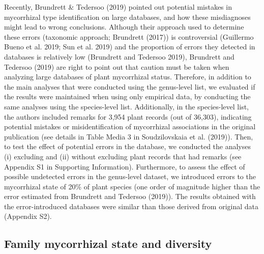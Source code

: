 \documentclass[
  12pt,
]{article}
\begin{document}
Recently, Brundrett \& Tedersoo (2019) pointed out potential mistakes in
mycorrhizal type identification on large databases, and how these
misdiagnoses might lead to wrong conclusions. Although their approach
used to determine these errors (taxonomic approach; Brundrett (2017)) is
controversial (Guillermo Bueno et al. 2019; Sun et al. 2019) and the
proportion of errors they detected in databases is relatively low
(Brundrett and Tedersoo 2019), Brundrett and Tedersoo (2019) are right
to point out that caution must be taken when analyzing large databases
of plant mycorrhizal status. Therefore, in addition to the main analyses
that were conducted using the genus-level list, we evaluated if the
results were maintained when using only empirical data, by conducting
the same analyses using the species-level list. Additionally, in the
species-level list, the authors included remarks for 3,954 plant records
(out of 36,303), indicating potential mistakes or misidentification of
mycorrhizal associations in the original publication (see details in
Table Media 3 in Soudzilovskaia et al. (2019)). Then, to test the effect
of potential errors in the database, we conducted the analyses (i)
excluding and (ii) without excluding plant records that had remarks (see
Appendix S1 in Supporting Information). Furthermore, to assess the
effect of possible undetected errors in the genus-level dataset, we
introduced errors to the mycorrhizal state of 20\% of plant species (one
order of magnitude higher than the error estimated from Brundrett and
Tedersoo (2019)). The results obtained with the error-introduced
databases were similar than those derived from original data (Appendix
S2).

\hypertarget{family-mycorrhizal-state-and-diversity}{%
\subsection{Family mycorrhizal state and
diversity}\label{family-mycorrhizal-state-and-diversity}}
\end{document}
